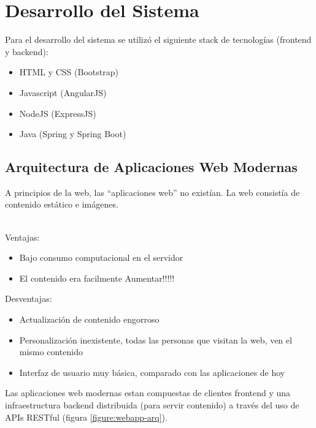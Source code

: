 \section{Desarrollo del Sistema}
	
	Para el desarrollo del sistema se utilizó el siguiente stack de tecnologías
	(frontend y backend):
	
	\begin{itemize}
	  \item HTML y CSS (Bootstrap)
	  \item Javascript (AngularJS)
	  \item NodeJS (ExpressJS)
	  \item Java (Spring y Spring Boot)
	\end{itemize}
	
	\subsection{Arquitectura de Aplicaciones Web Modernas}
		A principios de la web, las ``aplicaciones web'' no existían. La web
  		consistía de contenido estático e imágenes.\\\
  
  		Ventajas:
  
  		\begin{itemize}
			\item Bajo consumo computacional en el servidor
			\item El contenido era facilmente Aumentar!!!!!  
		\end{itemize}
		
		Desventajas:
		
		\begin{itemize}
			\item Actualización de contenido engorroso
			\item Personalización inexistente, todas las personas que visitan la web, ven
			el mismo contenido
			
			\item Interfaz de usuario muy básica, comparado con las aplicaciones de hoy
		\end{itemize}
		
		Las aplicaciones web modernas estan compuestas de clientes frontend y una
		infraestructura backend distribuida (para servir contenido) a través del
		uso de APIs RESTful (figura \ref{figure:webapp-arq}).
		
